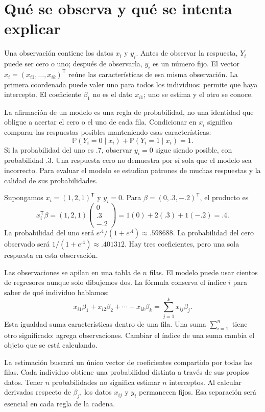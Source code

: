 \documentclass[11pt,a4paper]{article}
\newcommand{\Prob}{\mathbb P}
\newcommand{\T}{^{\mathsf T}}
\begin{document}
\clearpage
\section{Qué se observa y qué se intenta explicar}\label{logit1}
Una observación contiene los datos $x_i$ y $y_i$. Antes de observar la
respuesta, $Y_i$ puede ser cero o uno; después de observarla, $y_i$ es un
número fijo. El vector $x_i=(x_{i1},\ldots,x_{ik})\T$ reúne las características
de esa misma observación. La primera coordenada puede valer uno para todos
los individuos: permite que haya intercepto. El coeficiente $\beta_1$ no
es el dato $x_{i1}$; uno se estima y el otro se conoce.

La afirmación de un modelo es una regla de probabilidad, no una identidad
que obligue a acertar el cero o el uno de cada fila. Condicionar en $x_i$
significa comparar las respuestas posibles manteniendo esas características:
\[
\Prob(Y_i=0\mid x_i)+\Prob(Y_i=1\mid x_i)=1.
\]
Si la probabilidad del uno es $.7$, observar $y_i=0$ sigue siendo posible,
con probabilidad $.3$. Una respuesta cero no demuestra por sí sola que
el modelo sea incorrecto. Para evaluar el modelo se estudian patrones
de muchas respuestas y la calidad de sus probabilidades.

\begin{ejemplo}
Supongamos $x_i=(1,2,1)\T$ y $y_i=0$. Para
$\beta=(0,.3,-.2)\T$, el producto es
\[
x_i\T\beta=(1,2,1)
\begin{pmatrix}0\\.3\\-.2\end{pmatrix}
=1(0)+2(.3)+1(-.2)=.4.
\]
La probabilidad del uno será $e^{.4}/(1+e^{.4})\approx.598688$.
La probabilidad del cero observado será $1/(1+e^{.4})\approx.401312$.
Hay tres coeficientes, pero una sola respuesta en esta observación.
\end{ejemplo}
Las observaciones se apilan en una tabla de $n$ filas.
El modelo puede usar cientos de regresores aunque solo dibujemos dos.
La fórmula conserva el índice $i$ para saber de qué individuo hablamos:
\[
x_{i1}\beta_1+x_{i2}\beta_2+\cdots+x_{ik}\beta_k
=\sum_{j=1}^kx_{ij}\beta_j.
\]
Esta igualdad suma características dentro de una fila.
Una suma $\sum_{i=1}^n$ tiene otro significado: agrega observaciones.
Cambiar el índice de una suma cambia el objeto que se está calculando.

La estimación buscará un único vector de coeficientes compartido por todas
las filas. Cada individuo obtiene una probabilidad distinta a través de sus
propios datos. Tener $n$ probabilidades no significa estimar $n$ interceptos.
Al calcular derivadas respecto de $\beta_j$, los datos $x_{ij}$ y $y_i$
permanecen fijos. Esa separación será esencial en cada regla de la cadena.
\end{document}
